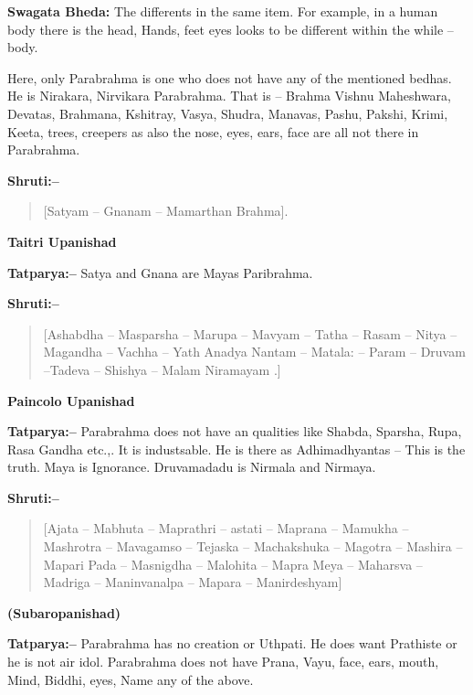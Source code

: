 \textbf{Swagata Bheda:} The differents in the same item. For example, in a human body there is the head, Hands, feet eyes looks to be different within the while – body.

Here, only Parabrahma is one who does not have any of the mentioned bedhas. He is Nirakara, Nirvikara Parabrahma. That is – Brahma Vishnu Maheshwara, Devatas, Brahmana, Kshitray, Vasya, Shudra, Manavas, Pashu, Pakshi, Krimi, Keeta, trees, creepers as also the nose, eyes, ears, face are all not there in Parabrahma.

\textbf{Shruti:–}

\begin{verse}
[Satyam – Gnanam – Mamarthan Brahma].
\end{verse}

\begin{flushright}
\textbf{Taitri Upanishad}
\end{flushright}

\textbf{Tatparya:–} Satya and Gnana are Mayas Paribrahma.

\textbf{Shruti:–}

\begin{verse}
[Ashabdha – Masparsha – Marupa – Mavyam – Tatha – Rasam – Nitya – Magandha – Vachha – Yath  Anadya Nantam – Matala: – Param – Druvam –Tadeva – Shishya – Malam Niramayam .]
\end{verse}

\begin{flushright}
\textbf{Paincolo Upanishad}
\end{flushright}

\textbf{Tatparya:–} Parabrahma does not have an qualities like Shabda, Sparsha, Rupa, Rasa Gandha etc.,. It is industsable. He is there as Adhimadhyantas – This is the truth. Maya is Ignorance. Druvamadadu is Nirmala and Nirmaya.

\textbf{Shruti:–}

\begin{verse}
[Ajata – Mabhuta – Maprathri – astati – Maprana – Mamukha – Mashrotra – Mavagamso – Tejaska – Machakshuka – Magotra – Mashira – Mapari Pada – Masnigdha – Malohita – Mapra Meya – Maharsva – Madriga – Maninvanalpa – Mapara – Manirdeshyam]
\end{verse}

\begin{flushright}
\textbf{(Subaropanishad)}
\end{flushright}

\textbf{Tatparya:–} Parabrahma has no creation or Uthpati. He does want Prathiste or he is not air idol. Parabrahma does not have Prana, Vayu, face, ears, mouth, Mind, Biddhi, eyes, Name any of the above.

